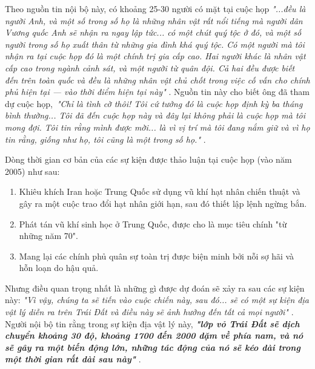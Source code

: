 \documentclass[10pt,twocolumn,letterpaper]{article}
\begin{document}
Theo nguồn tin nội bộ này, có khoảng 25-30 người có mặt tại cuộc họp \textit{"...đều là người Anh, và một số trong số họ là những nhân vật rất nổi tiếng mà người dân Vương quốc Anh sẽ nhận ra ngay lập tức... có một chút quý tộc ở đó, và một số người trong số họ xuất thân từ những gia đình khá quý tộc. Có một người mà tôi nhận ra tại cuộc họp đó là một chính trị gia cấp cao. Hai người khác là nhân vật cấp cao trong ngành cảnh sát, và một người từ quân đội. Cả hai đều được biết đến trên toàn quốc và đều là những nhân vật chủ chốt trong việc cố vấn cho chính phủ hiện tại — vào thời điểm hiện tại này"} \cite{4}. Nguồn tin này cho biết ông đã tham dự cuộc họp,\ \textit{"Chỉ là tình cờ thôi! Tôi cứ tưởng đó là cuộc họp định kỳ ba tháng bình thường... Tôi đã đến cuộc họp này và đây lại không phải là cuộc họp mà tôi mong đợi. Tôi tin rằng mình được mời... là vì vị trí mà tôi đang nắm giữ và vì họ tin rằng, giống như họ, tôi cũng là một trong số họ."} \cite{4}.

Dòng thời gian cơ bản của các sự kiện được thảo luận tại cuộc họp (vào năm 2005) như sau:
\begin{flushleft}
\begin{enumerate}
    \item Khiêu khích Iran hoặc Trung Quốc sử dụng vũ khí hạt nhân chiến thuật và gây ra một cuộc trao đổi hạt nhân giới hạn, sau đó thiết lập lệnh ngừng bắn.
    \item Phát tán vũ khí sinh học ở Trung Quốc, được cho là mục tiêu chính "từ những năm 70".
    \item Mang lại các chính phủ quân sự toàn trị được biện minh bởi nỗi sợ hãi và hỗn loạn do hậu quả.
\end{enumerate}
\end{flushleft}

Nhưng điều quan trọng nhất là những gì được dự đoán sẽ xảy ra sau các sự kiện này: \textit{"Vì vậy, chúng ta sẽ tiến vào cuộc chiến này, sau đó... sẽ có một sự kiện địa vật lý diễn ra trên Trái Đất và điều này sẽ ảnh hưởng đến tất cả mọi người"} \cite{4}. Người nội bộ tin rằng trong sự kiện địa vật lý này, \textit{\textbf{"lớp vỏ Trái Đất sẽ dịch chuyển khoảng 30 độ, khoảng 1700 đến 2000 dặm về phía nam, và nó sẽ gây ra một biến động lớn, những tác động của nó sẽ kéo dài trong một thời gian rất dài sau này"}} \cite{4}.
\end{document}
